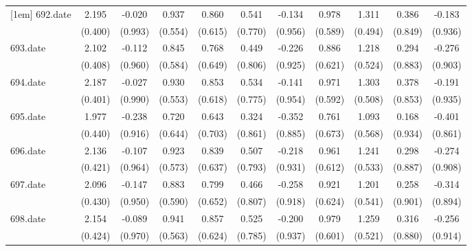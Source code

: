 \begin{tabular}{l*{10}{c}}
[1em]
692.date    &       2.195&      -0.020&       0.937&       0.860&       0.541&      -0.134&       0.978&       1.311&       0.386&      -0.183\\
            &     (0.400)&     (0.993)&     (0.554)&     (0.615)&     (0.770)&     (0.956)&     (0.589)&     (0.494)&     (0.849)&     (0.936)\\
[1em]
693.date    &       2.102&      -0.112&       0.845&       0.768&       0.449&      -0.226&       0.886&       1.218&       0.294&      -0.276\\
            &     (0.408)&     (0.960)&     (0.584)&     (0.649)&     (0.806)&     (0.925)&     (0.621)&     (0.524)&     (0.883)&     (0.903)\\
[1em]
694.date    &       2.187&      -0.027&       0.930&       0.853&       0.534&      -0.141&       0.971&       1.303&       0.378&      -0.191\\
            &     (0.401)&     (0.990)&     (0.553)&     (0.618)&     (0.775)&     (0.954)&     (0.592)&     (0.508)&     (0.853)&     (0.935)\\
[1em]
695.date    &       1.977&      -0.238&       0.720&       0.643&       0.324&      -0.352&       0.761&       1.093&       0.168&      -0.401\\
            &     (0.440)&     (0.916)&     (0.644)&     (0.703)&     (0.861)&     (0.885)&     (0.673)&     (0.568)&     (0.934)&     (0.861)\\
[1em]
696.date    &       2.136&      -0.107&       0.923&       0.839&       0.507&      -0.218&       0.961&       1.241&       0.298&      -0.274\\
            &     (0.421)&     (0.964)&     (0.573)&     (0.637)&     (0.793)&     (0.931)&     (0.612)&     (0.533)&     (0.887)&     (0.908)\\
[1em]
697.date    &       2.096&      -0.147&       0.883&       0.799&       0.466&      -0.258&       0.921&       1.201&       0.258&      -0.314\\
            &     (0.430)&     (0.950)&     (0.590)&     (0.652)&     (0.807)&     (0.918)&     (0.624)&     (0.541)&     (0.901)&     (0.894)\\
[1em]
698.date    &       2.154&      -0.089&       0.941&       0.857&       0.525&      -0.200&       0.979&       1.259&       0.316&      -0.256\\
            &     (0.424)&     (0.970)&     (0.563)&     (0.624)&     (0.785)&     (0.937)&     (0.601)&     (0.521)&     (0.880)&     (0.914)\\

\end{tabular}
